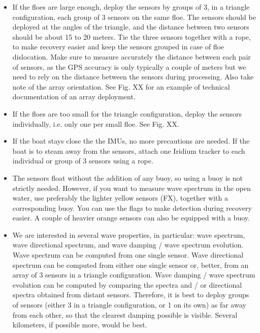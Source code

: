 \documentclass[pdftex,a4paper,12pt,twocolumn,fleqn,captions=tableheading]{scrartcl}
\begin{document}
\begin{itemize}
  \item If the floes are large enough, deploy the sensors by groups of 3, in a triangle configuration, each group of 3 sensors on the same floe. The sensors should be deployed at the angles of the triangle, and the distance between two sensors should be about 15 to 20 meters. Tie the three sensors together with a rope, to make recovery easier and keep the sensors grouped in case of floe dislocation. Make sure to measure accurately the distance between each pair of sensors, as the GPS accuracy is only typically a couple of meters but we need to rely on the distance between the sensors during processing. Also take note of the array orientation. See Fig. XX for an example of technical documentation of an array deployment.

  \item If the floes are too small for the triangle configuration, deploy the sensors individually, i.e. only one per small floe. See Fig. XX.

  \item If the boat stays close the the IMUs, no more precautions are needed. If the boat is to steam away from the sensors, attach one Iridium tracker to each individual or group of 3 sensors using a rope.

  \item The sensors float without the addition of any buoy, so using a buoy is not strictly needed. However, if you want to measure wave spectrum in the open water, use preferably the lighter yellow sensors (FX), together with a corresponding buoy. You can use the flags to make detection during recovery easier. A couple of heavier orange sensors can also be equipped with a buoy.

  \item We are interested in several wave properties, in particular: wave spectrum, wave directional spectrum, and wave damping / wave spectrum evolution. Wave spectrum can be computed from one single sensor. Wave directional spectrum can be computed from either one single sensor or, better, from an array of 3 sensors in a triangle configuration. Wave damping / wave spectrum evolution can be computed by comparing the spectra and / or directional spectra obtained from distant sensors. Therefore, it is best to deploy groups of sensors (either 3 in a triangle configuration, or 1 on its own) as far away from each other, so that the clearest damping possible is visible. Several kilometers, if possible more, would be best.
\end{itemize}
\end{document}
